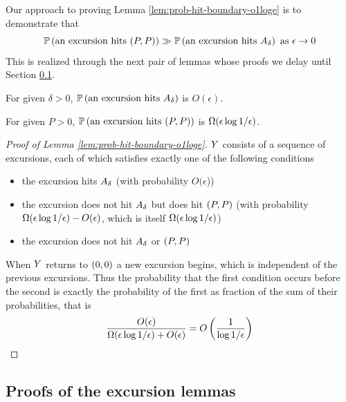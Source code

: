 {\newcommand{\probexcursionhits}[1]{\P\left(\text{an excursion hits } #1\right)}

Our approach to proving Lemma \ref{lem:prob-hit-boundary-o1loge} is to
demonstrate that
\[
\probexcursionhits{\farpoint} \gg
\probexcursionhits{\boundarylines} \text { as } \epsilon \to 0
\]
This is
realized through the next pair of lemmas whose proofs we delay until Section
\ref{proofs-of-the-excursion-lemmas}.

\newcommand{\Omegaeloge}{\Omega(\epsilon\loger)}

\begin{lemma}
  \label{lem:Phitboundaryline}
  For given $\delta > 0$, $\probexcursionhits{\boundarylines}$ is $O(\epsilon)$.
\end{lemma}

\begin{lemma}
  \label{lem:Pabsorbedandtravelsfar}
  For given $P > 0$, $\probexcursionhits{\farpoint}$ is $\Omegaeloge$.
\end{lemma}

\newcommand{\Oe}{O(\epsilon)}

\begin{proof}[Proof of Lemma \ref{lem:prob-hit-boundary-o1loge}]
  $Y$ consists of a sequence of excursions, each of which satisfies
  exactly one of the following conditions
  \begin{itemize}
  \item the excursion hits $A_\delta$ (with probability
    $O(\epsilon$))
  \item the excursion does not hit $A_\delta$ but does hit
    $(P,P)$ (with probability $\Omegaeloge-\Oe$, which is itself
    $\Omegaeloge$)
  \item the excursion does not hit $A_\delta$ or $(P,P)$
  \end{itemize}
  When $Y$ returns to $(0,0)$ a new excursion begins, which is independent of
  the previous excursions.  Thus the probability that the first
  condition occurs before the second is exactly the probability of the
  first as fraction of the sum of their probabilities, that is
  \[
  \frac{\Oe}{\Omegaeloge + \Oe} = O\left(\frac{1}{\loger}\right)
  \]
\end{proof}

\subsection{Proofs of the excursion lemmas}
\label{proofs-of-the-excursion-lemmas}
\newcommand{\tdh}{\rotproc^1}
\newcommand{\tdv}{\rotproc^2}
\newcommand{\rotproc}{Z}

}
